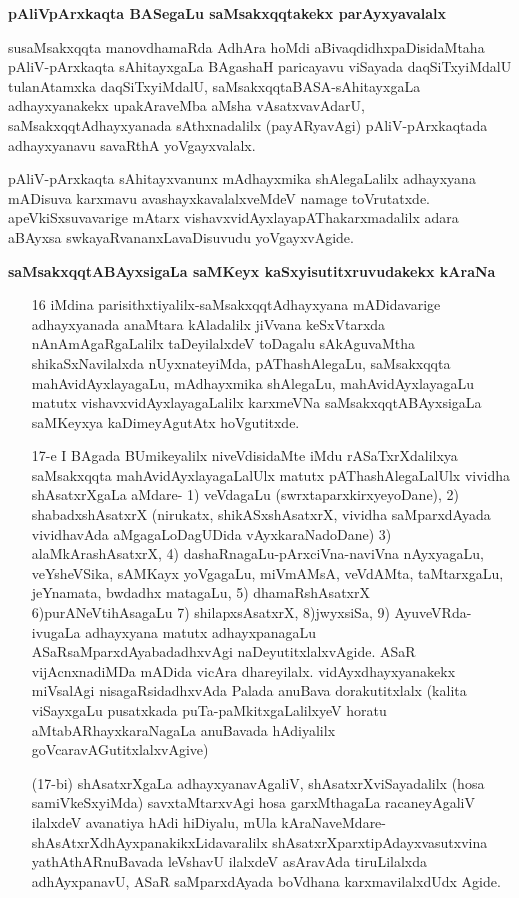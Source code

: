 \textbf{pAliVpArxkaqta BASegaLu saMsakxqqtakekx parAyxyavalalx}


susaMsakxqqta manovdhamaRda AdhAra hoMdi aBivaqdidhxpaDisidaMtaha pAliV-pArxkaqta sAhitayxgaLa BAgashaH paricayavu viSayada daqSiTxyiMdalU tulanAtamxka daqSiTxyiMdalU, saMsakxqqtaBASA-sAhitayxgaLa adhayxyanakekx upakAraveMba aMsha vAsatxvavAdarU, saMsakxqqtAdhayxyanada sAthxnadalilx (payARyavAgi) pAliV-pArxkaqtada adhayxyanavu savaRthA yoVgayxvalalx.


pAliV-pArxkaqta sAhitayxvanunx mAdhayxmika shAlegaLalilx adhayxyana mADisuva karxmavu avashayxkavalalxveMdeV namage toVrutatxde. apeVkiSxsuvavarige mAtarx vishavxvidAyxlayapAThakarxmadalilx adara aBAyxsa swkayaRvananxLavaDisuvudu yoVgayxvAgide.

\textbf{saMsakxqqtABAyxsigaLa saMKeyx kaSxyisutitxruvudakekx kAraNa}

\begin{itemize}
\item[16] iMdina parisithxtiyalilx-saMsakxqqtAdhayxyana mADidavarige adhayxyanada anaMtara kAladalilx jiVvana keSxVtarxda nAnAmAgaRgaLalilx taDeyilalxdeV toDagalu sAkAguvaMtha shikaSxNavilalxda nUyxnateyiMda, pAThashAlegaLu, saMsakxqqta mahAvidAyxlayagaLu, mAdhayxmika shAlegaLu, mahAvidAyxlayagaLu matutx vishavxvidAyxlayagaLalilx karxmeVNa saMsakxqqtABAyxsigaLa saMKeyxya kaDimeyAgutAtx hoVgutitxde.

\item[17-e] I BAgada BUmikeyalilx niveVdisidaMte iMdu rASaTxrXdalilxya saMsakxqqta mahAvidAyxlayagaLalUlx matutx pAThashAlegaLalUlx vividha shAsatxrXgaLa aMdare-
1) veVdagaLu (swrxtaparxkirxyeyoDane), 2) shabadxshAsatxrX (nirukatx, shikASxshAsatxrX, vividha saMparxdAyada vividhavAda aMgagaLoDagUDida vAyxkaraNadoDane) 3) alaMkArashAsatxrX, 4) dashaRnagaLu-pArxciVna-naviVna nAyxyagaLu, veYsheVSika, sAMKayx yoVgagaLu, miVmAMsA, veVdAMta, taMtarxgaLu, jeYnamata, bwdadhx matagaLu, 
5) dhamaRshAsatxrX 6)purANeVtihAsagaLu 7) shilapxsAsatxrX, 8)jwyxsiSa, 9) AyuveVRda-ivugaLa adhayxyana matutx adhayxpanagaLu ASaRsaMparxdAyabadadhxvAgi naDeyutitxlalxvAgide. ASaR vijAcnxnadiMDa mADida vicAra dhareyilalx. vidAyxdhayxyanakekx miVsalAgi nisagaRsidadhxvAda Palada anuBava dorakutitxlalx (kalita viSayxgaLu pusatxkada puTa-paMkitxgaLalilxyeV horatu aMtabARhayxkaraNagaLa anuBavada hAdiyalilx goVcaravAGutitxlalxvAgive)

(17-bi) shAsatxrXgaLa adhayxyanavAgaliV, shAsatxrXviSayadalilx (hosa samiVkeSxyiMda) savxtaMtarxvAgi hosa garxMthagaLa racaneyAgaliV ilalxdeV avanatiya hAdi hiDiyalu, mUla kAraNaveMdare-shAsAtxrXdhAyxpanakikxLidavaralilx shAsatxrXparxtipAdayxvasutxvina yathAthARnuBavada leVshavU ilalxdeV asAravAda tiruLilalxda adhAyxpanavU, ASaR saMparxdAyada boVdhana karxmavilalxdUdx Agide.
\end{itemize}


